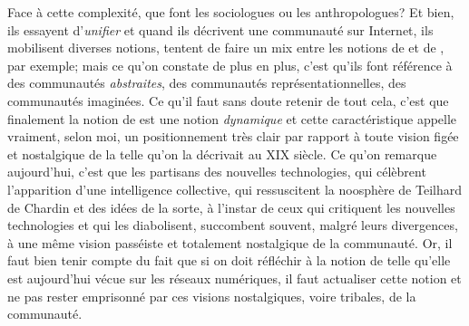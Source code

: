 {Face \`a cette complexit\'e, que font les sociologues ou les anthropologues? Et bien, ils essayent d'{\em unifier} et quand ils d\'ecrivent une communaut\'e sur Internet, ils mobilisent diverses notions, tentent de faire un mix entre les notions de  et de , par exemple; mais ce qu'on constate de plus en plus, c'est qu'ils font r\'ef\'erence \`a des communaut\'es {\em abstraites}, des communaut\'es repr\'esentationnelles, des communaut\'es imagin\'ees. Ce qu'il faut sans doute retenir de tout cela, c'est que finalement la notion de  est une notion {\em dynamique} et cette caract\'eristique appelle vraiment, selon moi, un positionnement tr\`es clair par rapport \`a toute vision fig\'ee et nostalgique de la  telle qu'on la d\'ecrivait au XIX si\`ecle. Ce qu'on remarque aujourd'hui, c'est que les partisans des nouvelles technologies, qui c\'el\`ebrent l'apparition d'une intelligence collective, qui ressuscitent la noosph\`ere de Teilhard de Chardin et des id\'ees de la sorte, \`a l'instar de ceux qui critiquent les nouvelles technologies et qui les diabolisent, succombent souvent, malgr\'e leurs divergences, \`a une m\^eme vision pass\'eiste et totalement nostalgique de la communaut\'e. Or, il faut bien tenir compte du fait que si on doit r\'efl\'echir \`a la notion de  telle qu'elle est aujourd'hui v\'ecue sur les r\'eseaux num\'eriques, il faut actualiser cette notion et ne pas rester emprisonn\'e par ces visions nostalgiques, voire tribales, de la communaut\'e.

}
